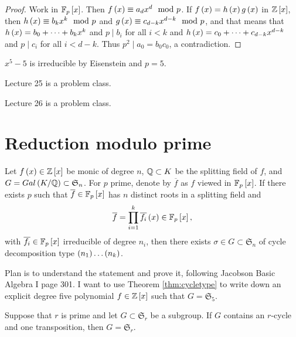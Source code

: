 \begin{proof}
Work in $ \mathbb{F}_p\left[ x \right] $. Then $ f\left( x \right) \equiv a_dx^d \mod p $. If $ f\left( x \right) = h\left( x \right)g\left( x \right) $ in $ \mathbb{Z}\left[ x \right] $, then $ h\left( x \right) \equiv b_kx^k \mod p $ and $ g\left( x \right) \equiv c_{d - k}x^{d - k} \mod p $, and that means that $ h\left( x \right) = b_0 + \dots + b_kx^k $ and $ p \mid b_i $ for all $ i < k $ and $ h\left( x \right) = c_0 + \dots + c_{d - k}x^{d - k} $ and $ p \mid c_i $ for all $ i < d - k $. Thus $ p^2 \mid a_0 = b_0c_0 $, a contradiction.
\end{proof}

\begin{example*}
$ x^5 - 5 $ is irreducible by Eisenstein and $ p = 5 $.
\end{example*}


Lecture 25 is a problem class.


Lecture 26 is a problem class.

\pagebreak

\section{Reduction modulo prime}


\begin{theorem}
\label{thm:cycletype}
Let $ f\left( x \right) \in \mathbb{Z}\left[ x \right] $ be monic of degree $ n $, $ \mathbb{Q} \subset K $ be the splitting field of $ f $, and $ G = Gal\left( K / \mathbb{Q} \right) \subset \mathfrak{S}_n $. For $ p $ prime, denote by $ \overline{f} $ as $ f $ viewed in $ \mathbb{F}_p\left[ x \right] $. If there exists $ p $ such that $ \overline{f} \in \mathbb{F}_p\left[ x \right] $ has $ n $ distinct roots in a splitting field and
$$ \overline{f} = \prod_{i = 1}^k \overline{f_i}\left( x \right) \in \mathbb{F}_p\left[ x \right], $$
with $ \overline{f_i} \in \mathbb{F}_p\left[ x \right] $ irreducible of degree $ n_i $, then there exists $ \sigma \in G \subset \mathfrak{S}_n $ of cycle decomposition type $ \left( n_1 \right) \dots \left( n_k \right) $.
\end{theorem}

Plan is to understand the statement and prove it, following Jacobson Basic Algebra I page 301. I want to use Theorem \ref{thm:cycletype} to write down an explicit degree five polynomial $ f \in \mathbb{Z}\left[ x \right] $ such that $ G = \mathfrak{S}_5 $.

\begin{proposition}
Suppose that $ r $ is prime and let $ G \subset \mathfrak{S}_r $ be a subgroup. If $ G $ contains an $ r $-cycle and one transposition, then $ G = \mathfrak{S}_r $.
\end{proposition}


